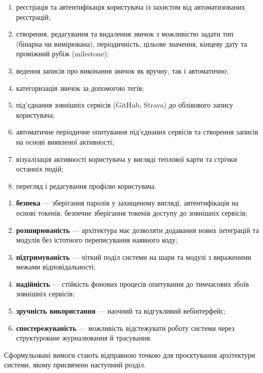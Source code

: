 \begin{enumerate}[noitemsep, topsep=2pt, leftmargin=*, label=\arabic*)]
    \item реєстрація та автентифікація користувача із захистом від автоматизованих реєстрацій;
    \item створення, редагування та видалення звичок з можливістю задати тип (бінарна чи вимірювана), періодичність, цільове значення, кінцеву дату та проміжний рубіж (milestone);
    \item ведення записів про виконання звичок як вручну, так і автоматично;
    \item категоризація звичок за допомогою тегів;
    \item під'єднання зовнішніх сервісів (GitHub, Strava) до облікового запису користувача;
    \item автоматичне періодичне опитування під'єднаних сервісів та створення записів на основі виявленої активності;
    \item візуалізація активності користувача у вигляді теплової карти та стрічки останніх подій;
    \item перегляд і редагування профілю користувача.
\end{enumerate}


\begin{enumerate}[noitemsep, topsep=2pt, leftmargin=*, label=\arabic*)]
    \item \textbf{безпека} — зберігання паролів у захищеному вигляді, автентифікація на основі токенів, безпечне зберігання токенів доступу до зовнішніх сервісів;
    \item \textbf{розширюваність} — архітектура має дозволяти додавання нових інтеграцій та модулів без істотного переписування наявного коду;
    \item \textbf{підтримуваність} — чіткий поділ системи на шари та модулі з вираженими межами відповідальності;
    \item \textbf{надійність} — стійкість фонових процесів опитування до тимчасових збоїв зовнішніх сервісів;
    \item \textbf{зручність використання} — наочний та відгукливий вебінтерфейс;
    \item \textbf{спостережуваність} — можливість відстежувати роботу системи через структуроване журналювання й трасування.
\end{enumerate}

Сформульовані вимоги стають відправною точкою для проєктування архітектури системи, якому присвячено наступний розділ.
